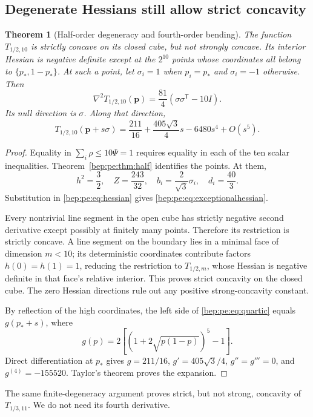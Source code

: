 \documentclass[11pt]{article}
\numberwithin{equation}{section}
\newtheorem{theorem}{Theorem}[section]
\theoremstyle{definition}
\theoremstyle{remark}
\newcommand{\p}{\boldsymbol p}
\begin{document}
\subsection{Degenerate Hessians still allow strict concavity}
\begin{theorem}[Half-order degeneracy and fourth-order bending]\label{bep:pe:thm:quartic}
The function $T_{1/2,10}$ is strictly concave on its closed cube, but
not strongly concave. Its interior Hessian is negative definite except
at the $2^{10}$ points whose coordinates all belong to $\{p_*,1-p_*\}$.
At such a point, let $\sigma_i=1$ when $p_i=p_*$ and $\sigma_i=-1$
otherwise. Then
\begin{equation}
 \nabla^2T_{1/2,10}(\p)
 =\frac{81}{4}\left(\sigma\sigma^{\mathsf T}-10I\right).\label{bep:pe:eq:exceptionalhessian}
\end{equation}
Its null direction is $\sigma$. Along that direction,
\begin{equation}
 T_{1/2,10}(\p+s\sigma)
 =\frac{211}{16}+\frac{405\sqrt3}{4}s-6480s^4+O(s^5).
 \label{bep:pe:eq:quartic}
\end{equation}
\end{theorem}
\begin{proof}
Equality in $\sum_i\rho\leq10\Psi=1$ requires equality in each of the
ten scalar inequalities. Theorem~\ref{bep:pe:thm:half} identifies the points.
At them,
\[
 h^2=\frac32,\quad Z=\frac{243}{32},\quad
 b_i=\frac2{\sqrt3}\sigma_i,\quad d_i=\frac{40}{3}.
\]
Substitution in \eqref{bep:pe:eq:hessian} gives
\eqref{bep:pe:eq:exceptionalhessian}.

Every nontrivial line segment in the open cube has strictly negative
second derivative except possibly at finitely many points. Therefore
its restriction is strictly concave. A line segment on the boundary
lies in a minimal face of dimension $m<10$; its deterministic
coordinates contribute factors $h(0)=h(1)=1$, reducing the restriction
to $T_{1/2,m}$, whose Hessian is negative definite in that face's
relative interior. This proves strict concavity on the closed cube.
The zero Hessian directions rule out any positive strong-concavity
constant.

By reflection of the high coordinates, the left side of
\eqref{bep:pe:eq:quartic} equals $g(p_*+s)$, where
\[
 g(p)=2\left[(1+2\sqrt{p(1-p)})^5-1\right].
\]
Direct differentiation at $p_*$ gives
$g=211/16$, $g'=405\sqrt3/4$, $g''=g'''=0$, and
$g^{(4)}=-155520$. Taylor's theorem proves the expansion.
\end{proof}
The same finite-degeneracy argument proves strict, but not strong,
concavity of $T_{1/3,11}$. We do not need its fourth derivative.
\end{document}

